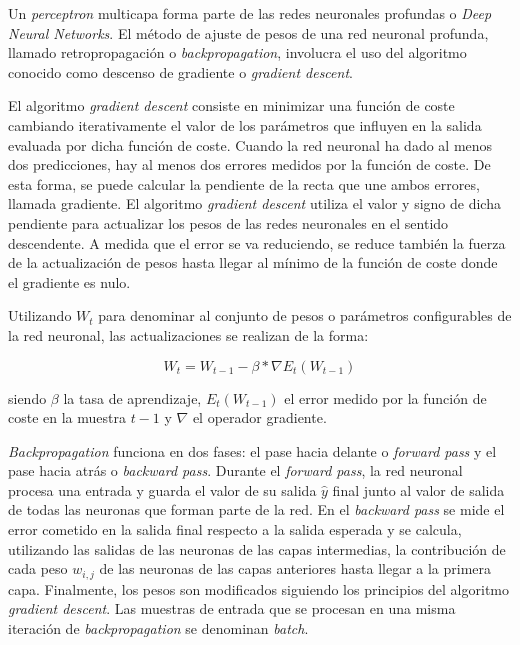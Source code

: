Un \textit{perceptron} multicapa forma parte de las redes neuronales profundas o \textit{Deep Neural Networks}. El método de ajuste de pesos de una red neuronal profunda, llamado retropropagación o \textit{backpropagation}, involucra el uso del algoritmo conocido como descenso de gradiente o \textit{gradient descent}.

El algoritmo \textit{gradient descent} consiste en minimizar una función de coste cambiando iterativamente el valor de los parámetros que influyen en la salida evaluada por dicha función de coste. Cuando la red neuronal ha dado al menos dos predicciones, hay al menos dos errores medidos por la función de coste. De esta forma, se puede calcular la pendiente de la recta que une ambos errores, llamada gradiente. El algoritmo \textit{gradient descent} utiliza el valor y signo de dicha pendiente para actualizar los pesos de las redes neuronales en el sentido descendente. A medida que el error se va reduciendo, se reduce también la fuerza de la actualización de pesos hasta llegar al mínimo de la función de coste donde el gradiente es nulo.

Utilizando $W_t$ para denominar al conjunto de pesos o parámetros configurables de la red neuronal, las actualizaciones se realizan de la forma:

\begin{equation}
	W_t=W_{t-1}-\beta*\nabla E_t(W_{t-1})
	\label{eq:gradientdescent}
\end{equation}

siendo $\beta$ la tasa de aprendizaje, $E_t(W_{t-1})$ el error medido por la función de coste en la muestra $t-1$ y $\nabla$ el operador gradiente.

\textit{Backpropagation} funciona en dos fases: el pase hacia delante o \textit{forward pass} y el pase hacia atrás o \textit{backward pass}. Durante el \textit{forward pass}, la red neuronal procesa una entrada y guarda el valor de su salida $\hat{y}$ final junto al valor de salida de todas las neuronas que forman parte de la red. En el \textit{backward pass} se mide el error cometido en la salida final respecto a la salida esperada y se calcula, utilizando las salidas de las neuronas de las capas intermedias, la contribución de cada peso $w_{i,j}$ de las neuronas de las capas anteriores hasta llegar a la primera capa. Finalmente, los pesos son modificados siguiendo los principios del algoritmo \textit{gradient descent}. Las muestras de entrada que se procesan en una misma iteración de \textit{backpropagation} se denominan \textit{batch}.

